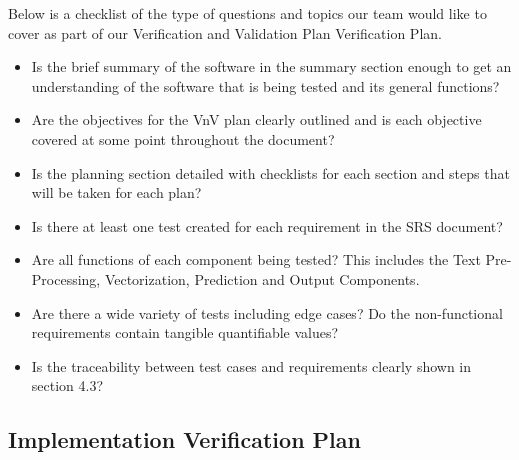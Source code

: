 \documentclass[12pt, titlepage]{article}
\begin{document}
  Below is a checklist of the type of questions and topics our team would like to cover as part of our Verification and Validation Plan Verification Plan.\\
  
  \begin{itemize}
  
  \item Is the brief summary of the software in the summary section enough to get an understanding of the software that is being tested and its general functions?
  \item Are the objectives for the VnV plan clearly outlined and is each objective covered at some point throughout the document?
  \item Is the planning section detailed with checklists for each section and steps that will be taken for each plan?
  \item Is there at least one test created for each requirement in the SRS document?
  \item Are all functions of each component being tested? This includes the Text Pre-Processing, Vectorization, Prediction and Output Components.
  \item Are there a wide variety of tests including edge cases?
  Do the non-functional requirements contain tangible quantifiable values?
  \item Is the traceability between test cases and requirements clearly shown in section 4.3?
  \end{itemize}
  
  
  \subsection{Implementation Verification Plan} \label{Implementation Verification Plan}
  
\end{document}
